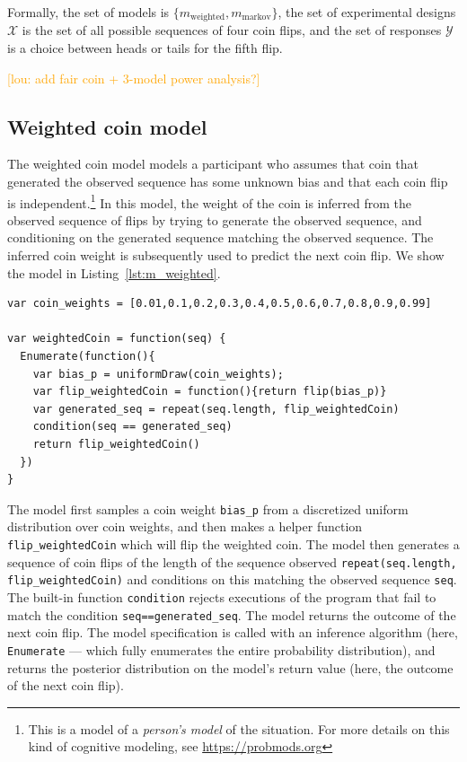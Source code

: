 \documentclass{article}
\newcommand{\lou}[1]{\textcolor{orange}{[lou: #1]}}
\begin{document}
Formally, the set of models is $\{m_{\text{weighted}}, m_{\text{markov}}\}$, the set of experimental designs $\mathcal{X}$ is the set of all possible sequences of four coin flips, and the set of responses $\mathcal{Y}$ is a choice between heads or tails for the fifth flip.

\lou{add fair coin + 3-model power analysis?}

\subsection{Weighted coin model}
\label{s:tutorial:sss:biased}

The weighted coin model models a participant who assumes that coin that generated the observed sequence has some unknown bias and that each coin flip is independent.\footnote{This is a model of a \emph{person's model} of the situation. For more details on this kind of cognitive modeling, see \url{https://probmods.org}}
In this model, the weight of the coin is inferred from the observed sequence of flips by trying to generate the observed sequence, and conditioning on the generated sequence matching the observed sequence.
The inferred coin weight is subsequently used to predict the next coin flip. We show the model in Listing~\ref{lst:m_weighted}.

\begin{lstlisting}[caption=Biased coin model,  label={lst:m_weighted}]
var coin_weights = [0.01,0.1,0.2,0.3,0.4,0.5,0.6,0.7,0.8,0.9,0.99]

var weightedCoin = function(seq) {
  Enumerate(function(){
    var bias_p = uniformDraw(coin_weights);
    var flip_weightedCoin = function(){return flip(bias_p)}
    var generated_seq = repeat(seq.length, flip_weightedCoin)
    condition(seq == generated_seq)
    return flip_weightedCoin()
  })
}
\end{lstlisting}

%
The model first samples a coin weight \lstinline{bias_p} from a discretized uniform distribution over coin weights, and
then makes a helper function \lstinline{flip_weightedCoin} which will flip the weighted coin.
The model then generates a sequence of coin flips of the length of the sequence observed \lstinline{repeat(seq.length, flip_weightedCoin)} and conditions on this matching the observed sequence \lstinline{seq}.
The built-in function \lstinline{condition} rejects executions of the program that fail to match the condition \lstinline{seq==generated_seq}.
The model returns the outcome of the next coin flip.
The model specification is called with an inference algorithm (here, \lstinline{Enumerate} --- which fully enumerates the entire probability distribution), and returns the posterior distribution on the model's return value (here, the outcome of the next coin flip).
\end{document}
